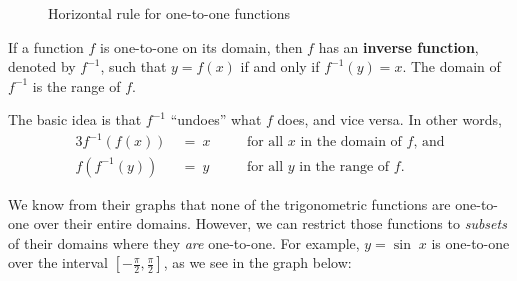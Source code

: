 \begin{figure}[h]
 \centering
 \qquad\qquad
 \vspace{-2mm}
 \caption[]{\quad Horizontal rule for one-to-one functions}
 \label{fig:horizontalrule}
\end{figure}

If a function $f$ is one-to-one on its domain, then $f$ has an \textbf{inverse function}, denoted
by $f^{-1}$, such that $y=f(x)$ if and only if $f^{-1}(y) = x$. The domain of $f^{-1}$ is the
range of $f$.

The basic idea is that $f^{-1}$ ``undoes'' what $f$ does, and vice versa. In other words,
\begin{alignat*}{3}
 f^{-1}(f(x)) ~&=~ x \quad&&\text{for all $x$ in the domain of $f$, and}\\
 f(f^{-1}(y)) ~&=~ y \quad&&\text{for all $y$ in the range of $f$.}
\end{alignat*}

We know from their graphs that none of the trigonometric functions are one-to-one over their entire
domains. However, we can restrict those functions to \emph{subsets} of their domains where they
\emph{are} one-to-one. For example, $y=\sin\;x$ is one-to-one over the interval
$\left[ -\frac{\pi}{2},\frac{\pi}{2} \right]$, as we see in the graph below:

